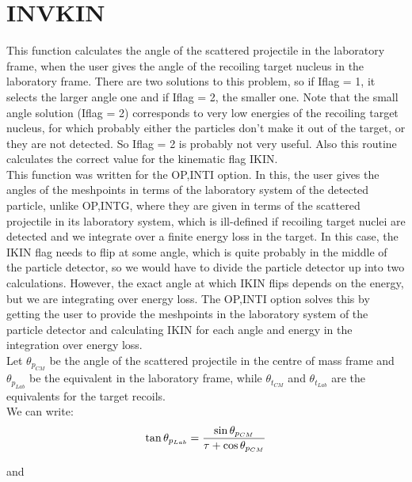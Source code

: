 \section{INVKIN}
\label{sect:invkin}

\noindent This function calculates the angle of the scattered projectile in
the laboratory frame, when the user gives the angle of the recoiling target
nucleus in the laboratory frame. There are two solutions to this problem, so
if Iflag = 1, it selects the larger angle one and if Iflag = 2, the smaller
one. Note that the small angle solution (Iflag = 2) corresponds to very low
energies of the recoiling target nucleus, for which probably either the
particles don't make it out of the target, or they are not detected. So
Iflag = 2 is probably not very useful. Also this routine calculates the
correct value for the kinematic flag IKIN.\\

\noindent This function was written for the OP,INTI option. In this, the
user gives the angles of the meshpoints in terms of the laboratory system of
the detected particle, unlike OP,INTG, where they are given in terms of the
scattered projectile in its laboratory system, which is ill-defined if
recoiling target nuclei are detected and we integrate over a finite energy
loss in the target. In this case, the IKIN flag needs to flip at some angle,
which is quite probably in the middle of the particle detector, so we would
have to divide the particle detector up into two calculations. However, the
exact angle at which IKIN flips depends on the energy, but we are
integrating over energy loss. The OP,INTI option solves this by getting the
user to provide the meshpoints in the laboratory system of the particle
detector and calculating IKIN for each angle and energy in the integration
over energy loss.\\

Let $\theta_{p_{CM}}$ be the angle of the scattered projectile in the centre
of mass frame and $\theta_{p_{Lab}}$ be the equivalent in the laboratory
frame, while $\theta_{t_{CM}}$ and $\theta_{t_{Lab}}$ are the equivalents
for the target recoils.\\

We can write:
\begin{equation}
\tan \theta_{p_{Lab}} = {\sin \theta_{p_{CM}} \over
\tau + \cos \theta_{p_{CM}}}
\label{eq:theta_p_lab}
\end{equation}

and 

